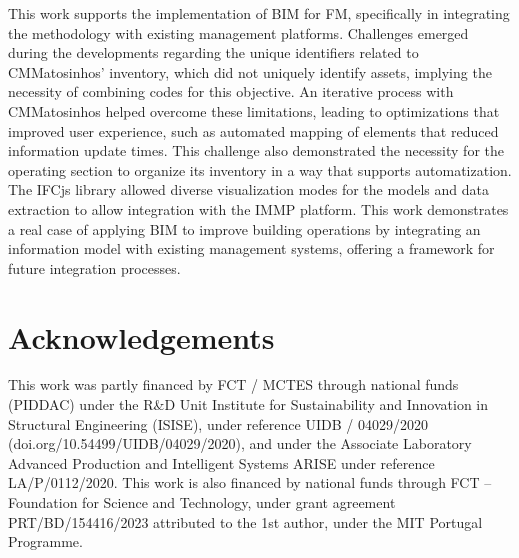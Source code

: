 \documentclass[a4paper, 10pt, twocolumn, twoside]{article}
\begin{document}
This work supports the implementation of BIM for FM, specifically in integrating the methodology with existing management platforms. Challenges emerged during the developments regarding the unique identifiers related to CMMatosinhos' inventory, which did not uniquely identify assets, implying the necessity of combining codes for this objective. An iterative process with CMMatosinhos helped overcome these limitations, leading to optimizations that improved user experience, such as automated mapping of elements that reduced information update times. This challenge also demonstrated the necessity for the operating section to organize its inventory in a way that supports automatization. The IFCjs library allowed diverse visualization modes for the models and data extraction to allow integration with the IMMP platform. This work demonstrates a real case of applying BIM to improve building operations by integrating an information model with existing management systems, offering a framework for future integration processes.

\section{Acknowledgements}
\label{sec:acknowledgements}

This work was partly financed by FCT / MCTES through national funds (PIDDAC) under the R\&D Unit Institute for Sustainability and Innovation in Structural Engineering (ISISE), under reference UIDB / 04029/2020 (doi.org/10.54499/UIDB/04029/2020), and under the Associate Laboratory Advanced Production and Intelligent Systems ARISE under reference LA/P/0112/2020. This work is also financed by national funds through FCT – Foundation for Science and Technology, under grant agreement PRT/BD/154416/2023 attributed to the 1st author, under the MIT Portugal Programme.


\end{document}
